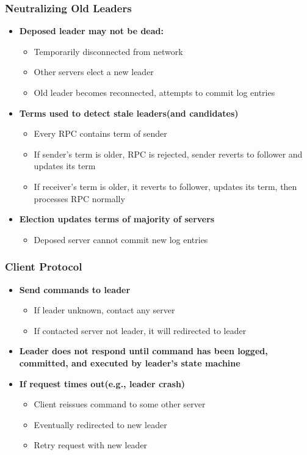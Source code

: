 \begin{frame}
    \frametitle{Neutralizing Old Leaders}
    \begin{itemize}
        \item \textbf{Deposed leader may not be dead:}
            \begin{itemize}
                \item Temporarily disconnected from network
                \item Other servers elect a new leader
                \item Old leader becomes reconnected, attempts to commit log entries
            \end{itemize}
        \item \textbf{Terms used to detect stale leaders(and candidates)}
            \begin{itemize}
                \item Every RPC contains term of sender
                \item If sender's term is older, RPC is rejected, sender reverts to follower and updates its term
                \item If receiver's term is older, it reverts to follower, updates its term, then processes RPC normally
            \end{itemize}
        \item \textbf{Election updates terms of majority of servers}
            \begin{itemize}
                \item Deposed server cannot commit new log entries
            \end{itemize}
    \end{itemize}
\end{frame}

\begin{frame}
    \frametitle{Client Protocol}
    \begin{itemize}
        \item \textbf{Send commands to leader}
            \begin{itemize}
                \item If leader unknown, contact any server
                \item If contacted server not leader, it will redirected to leader
            \end{itemize}
        \item \textbf{Leader does not respond until command has been logged, committed, and executed by leader's state machine}
        \item \textbf{If request times out(e.g., leader crash)}
            \begin{itemize}
                \item Client reissues command to some other server
                \item Eventually redirected to new leader
                \item Retry request with new leader
            \end{itemize}
    \end{itemize}
\end{frame}

